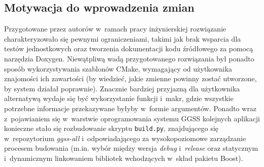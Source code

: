 \subsection{Motywacja do wprowadzenia zmian}
Przygotowane przez autorów w~ramach pracy inżynierskiej rozwiązanie charakteryzowało się pewnymi ograniczeniami, takimi jak brak wsparcia dla testów jednostkowych oraz tworzenia dokumentacji kodu źródłowego za pomocą narzędzia Doxygen. Niewątpliwą wadą przygotowanego rozwiązania był ponadto sposób wykorzystywania szablonów CMake, wymagający od użytkownika znajomości ich zawartości (by wiedzieć, jakie zmienne powinny zostać utworzone, by system działał poprawnie). Znacznie bardziej przyjazną dla użytkownika alternatywą wydaje się być wykorzystanie funkcji i~makr, gdzie wszystkie potrzebne informacje przekazywane byłyby w~formie argumentów. Ponadto wraz z~pojawianiem się w~warstwie oprogramowania systemu GGSS kolejnych aplikacji konieczne stało się rozbudowanie skryptu \lstinline{build.py}, znajdującego się w~repozytorium \emph{ggss-all} i~odpowiadającego za wysokopoziomowe zarządzanie procesem budowania (m.in. wybór między wersja \emph{debug} i~\emph{release} oraz statycznym i~dynamicznym linkowaniem bibliotek wchodzących w~skład pakietu Boost).

